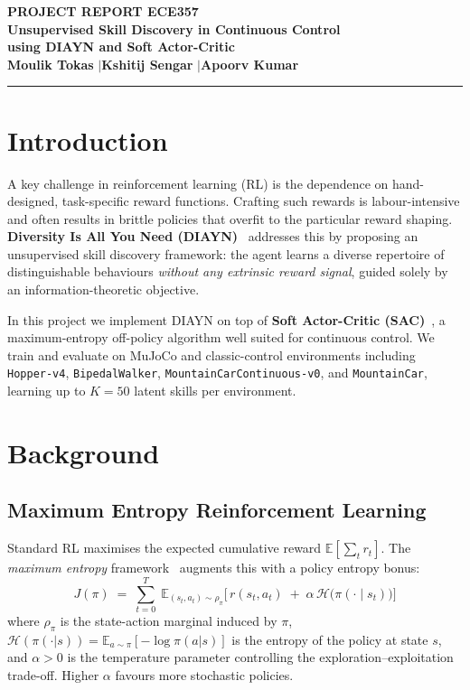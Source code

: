 \documentclass[11pt,a4paper]{article}
\begin{document}
\begin{center}
    {\small\textbf{\color{titleblue} PROJECT REPORT ECE357}}\\[10pt]
    {\LARGE\bfseries\color{titleblue} Unsupervised Skill Discovery in Continuous Control\\using DIAYN and Soft Actor-Critic}\\[10pt]
    {\large \textbf{Moulik Tokas} \quad$|$\quad \textbf{Kshitij Sengar} \quad$|$\quad \textbf{Apoorv Kumar}}\\[2pt]
    \textcolor{accentgold}{\rule{\textwidth}{1.5pt}}
\end{center}

\section{Introduction}

A key challenge in reinforcement learning (RL) is the dependence on hand-designed, task-specific reward functions. Crafting such rewards is labour-intensive and often results in brittle policies that overfit to the particular reward shaping. \textbf{Diversity Is All You Need (DIAYN)}~\cite{eysenbach2019diayn} addresses this by proposing an unsupervised skill discovery framework: the agent learns a diverse repertoire of distinguishable behaviours \emph{without any extrinsic reward signal}, guided solely by an information-theoretic objective.

In this project we implement DIAYN on top of \textbf{Soft Actor-Critic (SAC)}~\cite{haarnoja2018sac}, a maximum-entropy off-policy algorithm well suited for continuous control. We train and evaluate on MuJoCo and classic-control environments including \texttt{Hopper-v4}, \texttt{BipedalWalker}, \texttt{MountainCarContinuous-v0}, and \texttt{MountainCar}, learning up to $K{=}50$ latent skills per environment.

\section{Background}

\subsection{Maximum Entropy Reinforcement Learning}

Standard RL maximises the expected cumulative reward $\mathbb{E}\!\left[\sum_t r_t\right]$. The \emph{maximum entropy} framework~\cite{haarnoja2018sac} augments this with a policy entropy bonus:
\begin{equation}\label{eq:maxent}
    J(\pi) \;=\; \sum_{t=0}^{T}\;\mathbb{E}_{(s_t,a_t)\sim\rho_\pi}\!\Big[\,r(s_t,a_t) \;+\; \alpha\,\mathcal{H}\!\big(\pi(\cdot\mid s_t)\big)\Big]
\end{equation}
where $\rho_\pi$ is the state-action marginal induced by $\pi$, $\mathcal{H}(\pi(\cdot|s)) = \mathbb{E}_{a\sim\pi}[-\log\pi(a|s)]$ is the entropy of the policy at state $s$, and $\alpha > 0$ is the temperature parameter controlling the exploration--exploitation trade-off. Higher $\alpha$ favours more stochastic policies.
\end{document}
